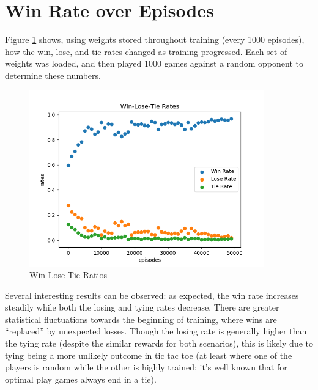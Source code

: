 \documentclass{article}
\begin{document}
   \section{Win Rate over Episodes}
   Figure \ref{fig:6} shows, using weights stored throughout training (every 1000 episodes), how the win, lose,
   and tie rates changed as training progressed. Each set of weights was loaded, and then played 1000 games against
   a random opponent to determine these numbers.
      \begin{figure}[h] \centering
          \includegraphics[width=4in]{resources/part6}
          \caption{ Win-Lose-Tie Ratios }
          \label{fig:6}
       \end{figure}
   Several interesting results can be observed: as expected, the win rate increases steadily while both the losing
   and tying rates decrease. There are greater statistical fluctuations towards the beginning of training, where
   wins are ``replaced'' by unexpected losses. Though the losing rate is generally higher than the tying rate (despite
   the similar rewards for both scenarios), this is likely due to tying being a more unlikely outcome in tic tac toe (at
   least where one of the players is random while the other is highly trained; it's well known that for optimal play
   games always end in a tie).
\end{document}
